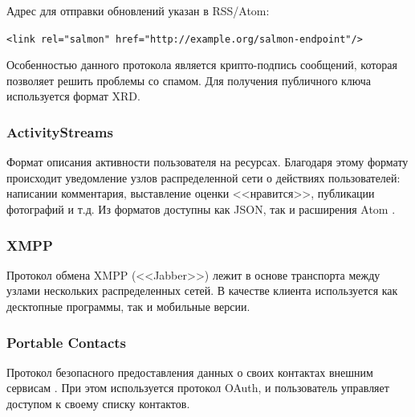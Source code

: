 \documentclass[10pt, a5paper]{article}
\begin{document}
    Адрес для отправки обновлений указан в RSS/Atom:

        \verb!<link rel="salmon" href="http://example.org/salmon-endpoint"/>!

    Особенностью данного протокола является крипто-подпись сообщений,
    которая позволяет решить проблемы со спамом. Для получения
    публичного ключа используется формат XRD.

    \subsubsection*{ActivityStreams}
    \begin{figure}[ht]
\end{figure}
    Формат описания активности пользователя на ресурсах. Благодаря этому
    формату происходит уведомление узлов распределенной сети о действиях
    пользователей: написании комментария, выставление оценки <<нравится>>,
    публикации фотографий и т.д. Из форматов доступны как JSON, так и
    расширения Atom \cite{zag4}.

    \subsubsection*{XMPP}
    Протокол обмена XMPP (<<Jabber>>) лежит в основе транспорта между
    узлами нескольких распределенных сетей. В качестве клиента
    используется как десктопные программы, так и мобильные версии.

    \subsubsection*{Portable Contacts}
    Протокол безопасного предоставления данных о своих контактах внешним
    сервисам \cite{zag5}. При этом используется протокол OAuth, и
    пользователь управляет доступом к своему списку контактов.
\end{document}
